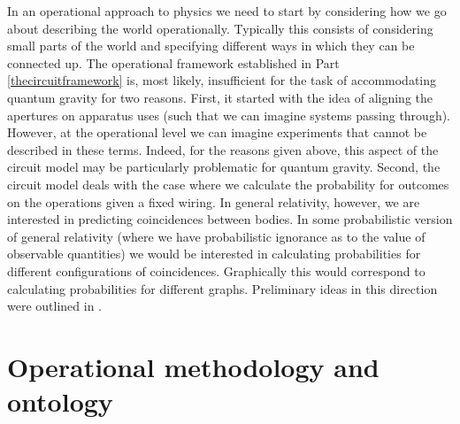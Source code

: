\documentclass[10pt]{article}
\begin{document}
In an operational approach to physics we need to start by considering how we go about describing the world operationally.  Typically this consists of considering small parts of the world and specifying different ways in which they can be connected up.  The operational framework established in Part \ref{thecircuitframework} is, most likely, insufficient for the task of accommodating quantum gravity for two reasons.  First, it started with the idea of aligning the apertures on apparatus uses (such that we can imagine systems passing through).  However, at the operational level we can imagine experiments that cannot be described in these terms.  Indeed, for the reasons given above, this aspect of the circuit model may be particularly problematic for quantum gravity.  Second, the circuit model deals with the case where we calculate the probability for outcomes on the operations given a fixed wiring.  In general relativity, however, we are interested in predicting coincidences between bodies.  In some probabilistic version of general relativity (where we have probabilistic ignorance as to the value of observable quantities) we would be interested in calculating probabilities for different configurations of coincidences. Graphically this would correspond to calculating probabilities for different graphs.  Preliminary ideas in this direction were outlined in \cite{hardy2009operational}.


\section{Operational methodology and ontology}\label{ontology}
\end{document}
